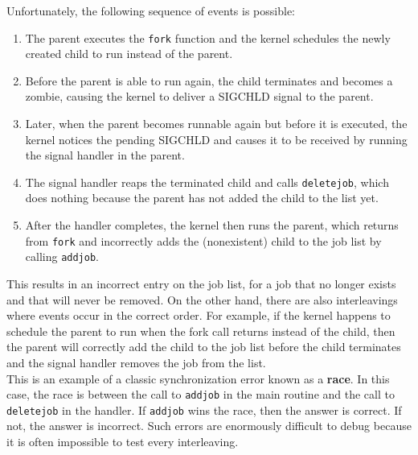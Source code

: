 \documentclass[11pt]{article}
\begin{document}
Unfortunately, the following sequence of events is possible:\\
\begin{enumerate}
\item The parent executes the \texttt{fork} function and the kernel schedules the newly created child to run instead of the parent.\\
\item Before the parent is able to run again, the child terminates and becomes a zombie, causing the kernel to deliver a SIGCHLD signal to the parent.\\
\item Later, when the parent becomes runnable again but before it is executed, the kernel notices the pending SIGCHLD and causes it to be received by running the signal handler in the parent.\\
\item The signal handler reaps the terminated child and calls \texttt{deletejob}, which does nothing because the parent has not added the child to the list yet.\\
\item After the handler completes, the kernel then runs the parent, which returns from \texttt{fork} and incorrectly adds the (nonexistent) child to the job list by calling \texttt{addjob}.\\
\end{enumerate}


This results in an incorrect entry on the job list, for a job that no longer exists and that will never be removed. On the other hand, there are also interleavings where events occur in the correct order. For example, if the kernel happens to schedule the parent to run when the fork call returns instead of the child, then the parent will correctly add the child to the job list before the child terminates and the signal handler removes the job from the list.\\


This is an example of a classic synchronization error known as a \textbf{race}. In this case, the race is between the call to \texttt{addjob} in the main routine and the call to \texttt{deletejob} in the handler. If \texttt{addjob} wins the race, then the answer is correct. If not, the answer is incorrect. Such errors are enormously difficult to debug because it is often impossible to test every interleaving.\\
\end{document}
